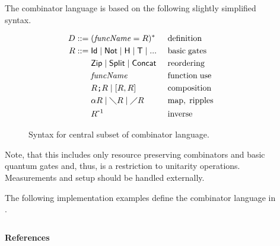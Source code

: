 \documentclass[final]{beamer}
\newlength{\sepwid}
\newlength{\onecolwid}
\begin{document}
\begin{frame}[t]
\begin{columns}[t,onlytextwidth]
\begin{column}{\onecolwid}
\begin{block}{}
  \vspace{-22mm}
The combinator language is based on the following slightly simplified syntax.

\vspace{-15mm}
\begin{figure}
\begin{align*}
D ::=&\; (\mathit{funcName} = R)^* &~& \mathrm{definition} \\
R ::=&\; \id  \;|\; \notg \;|\; \hgate \;|\; \tgate \;|\; ... &&\mathrm{basic\;gates}  \\
     &\; \zip \;|\; \spli \;|\; \concat  && \mathrm{reordering} \\
     &\; \mathit{funcName}  && \mathrm{function\;use} \\
     &\; R \o R \;|\; [R,R] && \mathrm{composition} \\
     &\; \a R \;|\;\fdown{} R \;|\; \fup{} R && \mathrm{map,\;ripples} \\%
     &\; \i{R}  && \mathrm{inverse}
\end{align*}
\caption{Syntax for central subset of combinator language.}
\end{figure}

Note, that this includes only resource preserving combinators and basic quantum gates and, thus, is a restriction to unitarity operations. Measurements and setup should be handled externally.

The following implementation examples define the combinator language in \rfun.

\end{block}

\end{column}

\begin{column}{\sepwid}~\end{column} %

\begin{column}{\onecolwid}

\RevRFunQC

\end{column}

\end{columns}

\vspace{10mm}
\textbf{\large References}


\end{frame}
\end{document}

